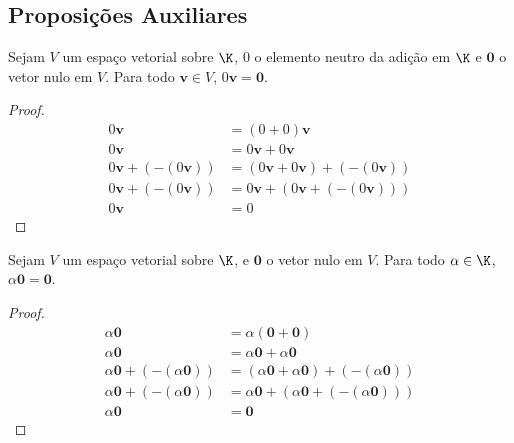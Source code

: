 \subsection{Proposições Auxiliares}

\begin{proposition} \label{leftnull} Sejam $V$ um espaço vetorial sobre $\K$,
$0$ o elemento neutro da adição em $\K$ e $\bm{0}$ o vetor nulo em $V$.
Para todo $\bm{v} \in V$, $0 \bm{v} = \bm{0}$.
\end{proposition}

\begin{proof}
\begin{align*}
  0 \bm{v} &= (0 + 0) \bm{v} \tag{C-A3} \\
  0 \bm{v} &= 0 \bm{v} + 0 \bm{v} \tag{EV-D2} \\
  0 \bm{v} + (-(0 \bm{v})) &= (0 \bm{v} + 0 \bm{v}) +(-(0 \bm{v})) \tag{EV-A} \\
  0 \bm{v} + (-(0 \bm{v})) &= 0 \bm{v} + (0 \bm{v} +(-(0 \bm{v}))) \tag{EV-A2} \\
  0 \bm{v} &= 0 \tag{EV-A4}
\end{align*}
\end{proof}

\begin{proposition} \label{rightnull} Sejam $V$ um espaço vetorial sobre $\K$,
e $\bm{0}$ o vetor nulo em $V$. Para todo $\alpha \in \K$, $\alpha \bm{0} = \bm{0}$.
\end{proposition}

\begin{proof}
\begin{align*}
  \alpha \bm{0} &= \alpha (\bm{0} + \bm{0}) \tag{EV-A3} \\
  \alpha \bm{0} &= \alpha \bm{0} + \alpha \bm{0} \tag{C-D2} \\
  \alpha \bm{0} + (-(\alpha \bm{0})) &= (\alpha \bm{0} + \alpha \bm{0}) + (-(\alpha \bm{0})) \tag{EV-A} \\
  \alpha \bm{0} + (-(\alpha \bm{0})) &= \alpha \bm{0} + (\alpha \bm{0} + (-(\alpha \bm{0}))) \tag{EV-A2} \\
  \alpha \bm{0} &= \bm{0} \tag{EV-A4}
\end{align*}
\end{proof}

